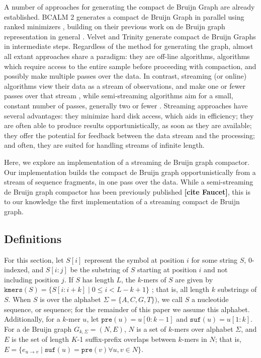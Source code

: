 \documentclass[preprint,number,12pt]{elsarticle}
\begin{document}
A number of approaches for generating the compact de Bruijn Graph are already established. BCALM 2 generates a compact de Bruijn Graph in parallel using ranked minimizers \cite{chikhi2016compacting}, building on their previous work on de Bruijn graph representation in general \cite{chikhi2015representation}.
Velvet \cite{zerbino_velvet:_2008} and Trinity \cite{grabherr_full-length_2011} generate compact de Bruijn Graphs in intermediate steps.
Regardless of the method for generating the graph, almost all extant approaches share a paradigm: they are off-line algorithms, algorithms which require access to the entire sample before proceeding with compaction, and possibly make multiple passes over the data.
In contrast, streaming (or online) algorithms view their data as a stream of observations, and make one or fewer passes over that stream \cite{mcgregor_graph_2014}, while semi-streaming algorithms aim for a small, constant number of passes, generally two or fewer \cite{feigenbaum_graph_2005}.
Streaming approaches have several advantages: they minimize hard disk access, which aids in efficiency; they are often able to produce results opportunistically, as soon as they are available; they offer the potential for feedback between the data stream and the processing; and often, they are suited for handling streams of infinite length.


Here, we explore an implementation of a streaming de Bruijn graph compactor. Our implementation builds the compact de Bruijn graph opportunistically from a stream of sequence fragments, in one pass over the data. While a semi-streaming de Bruijn graph compactor has been previously published \textbf{[cite Faucet]}, this is to our knowledge the first implementation of a streaming compact de Bruijn graph.

\subsection{Definitions}\label{sec:definitions}

For this section, let $S[i]$ represent the symbol at position $i$ for some string $S$, $0$-indexed, and $S[i:j]$ be the substring of $S$ starting at position $i$ and not including position $j$. 
If $S$ has length $L$, the $k$-mers of $S$ are given by $\texttt{kmers}(S) = \{S[i:i+k] \mid 0 \le i < L-k+1 \}$ ; that is, all length $k$ substrings of $S$.
When $S$ is over the alphabet $\Sigma=\{A,C,G,T\})$, we call $S$ a nucleotide sequence, or sequence; for the remainder of this paper we assume this alphabet.
Additionally, for a $k$-mer $u$, let $\texttt{pre}(u)=u[0:k-1]$ and $\texttt{suf}(u)=u[1:k]$. 
For a de Bruijn graph $G_{k, \Sigma} = (N,E)$, $N$ is a set of $k$-mers over alphabet $\Sigma$, and $E$ is the set of length $K$-1 suffix-prefix overlaps between $k$-mers in $N$; that is, $E = \{e_{u \rightarrow v} \mid \texttt{suf}(u) = \texttt{pre}(v) \forall u,v \in N \}$.
\end{document}

